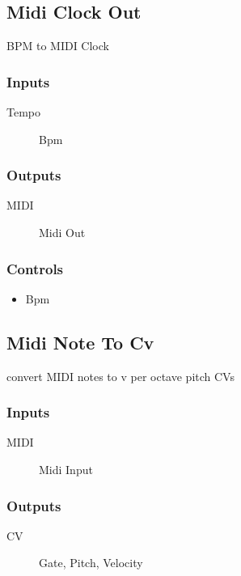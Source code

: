\subsection{Midi Clock Out}

BPM to MIDI Clock



\subsubsection{Inputs}
\begin{description}
\item [Tempo] Bpm
\end{description}

\subsubsection{Outputs}
\begin{description}
\item [MIDI] Midi Out
\end{description}

\subsubsection{Controls}
\begin{itemize}
\item Bpm
\end{itemize}

\subsection{Midi Note To Cv}

convert MIDI notes to v per octave pitch CVs



\subsubsection{Inputs}
\begin{description}
\item [MIDI] Midi Input
\end{description}

\subsubsection{Outputs}
\begin{description}
\item [CV] Gate, Pitch, Velocity
\end{description}

